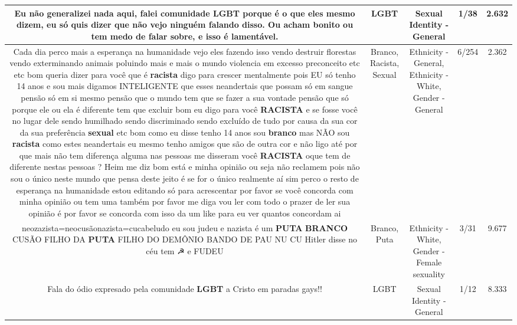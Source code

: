 \documentclass[11pt]{article}
\newlength\mylength
\begin{document}
\begin{center}
\begin{longtable}{|C{.65\mylength}|C{.30\mylength}|C{.12\mylength}|C{.12\mylength}|C{.12\mylength}|}
  \small Eu não generalizei nada aqui, falei comunidade \textbf{LGBT} porque é o que eles mesmo dizem, eu só quis dizer que não vejo ninguém falando disso. Ou acham bonito ou tem medo de falar sobre, e isso é lamentável.\normalsize   & LGBT & Sexual Identity - General & 1/38 & 2.632 \\  \hline
  \small Cada dia perco mais a esperança na humanidade  vejo eles fazendo isso vendo destruir florestas vendo exterminando animais poluindo mais e mais o mundo violencia em excesso  preconceito etc etc bom queria dizer para você que é \textbf{racista} digo para crescer mentalmente  pois EU só tenho 14 anos e sou mais digamos INTELIGENTE que esses neandertais que possam só em sangue pensão só em si mesmo pensão que o mundo tem que se fazer a sua vontade pensão que só porque ele ou ela é diferente tem que excluir bom eu digo para você \textbf{RACISTA} e se fosse você no lugar dele sendo humilhado sendo discriminado sendo excluído de tudo por causa da sua cor da sua preferência \textbf{sexual} etc bom como eu disse tenho 14 anos sou \textbf{branco} mas NÃO sou \textbf{racista} como estes neandertais eu mesmo tenho amigos que são de outra cor e não ligo até por que mais não tem diferença alguma nas pessoas me disseram você \textbf{RACISTA} oque tem de diferente nestas pessoas ? Heim me diz bom está e minha opinião ou seja não reclamem pois não sou o único neste mundo que pensa deste jeito é se for o único realmente aí sim perco o resto de esperança na humanidade  estou editando só para acrescentar por favor se você concorda com minha opinião ou tem uma também por favor me diga vou ler com todo o prazer de ler sua opinião é por favor se concorda com isso da um like para eu ver quantos concordam ai\normalsize   & Branco, Racista, Sexual & Ethnicity - General, Ethnicity - White, Gender - General & 6/254 & 2.362 \\  \hline
  \small neozazista=neocusãonazista=cucabeludo eu sou judeu e nazista é um \textbf{PUTA} \textbf{BRANCO} CUSÃO FILHO DA \textbf{PUTA} FILHO DO DEMÔNIO BANDO DE PAU NU CU    Hitler disse no céu tem ☭ e FUDEU\normalsize   & Branco, Puta & Ethnicity - White, Gender - Female sexuality & 3/31 & 9.677 \\  \hline
  \small Fala do ódio expresado pela comunidade \textbf{LGBT} a Cristo em paradas gays!!\normalsize   & LGBT & Sexual Identity - General & 1/12 & 8.333 \\  \hline

\end{longtable}
\end{center}
\end{document}
